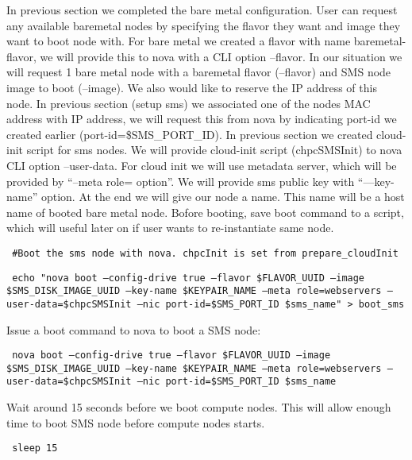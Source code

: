 \documentclass[12pt]{article}
\begin{document}
In previous section we completed the bare metal configuration. User can request any available baremetal nodes by specifying the flavor they want and image they want to boot node with. For bare metal we created a flavor with name baremetal-flavor, we will provide this to nova with a CLI option –flavor. In our situation we will request 1 bare metal node with a baremetal flavor (--flavor) and SMS node image to boot (--image).  We also would like to reserve the IP address of this node. In previous section (setup sms) we associated one of the nodes MAC address with IP address, we will request this from nova by indicating port-id we created earlier (port-id=\${SMS\_PORT\_ID}). In previous section we created cloud-init script for sms nodes. We will provide cloud-init script (chpcSMSInit) to nova CLI option –user-data. For cloud init we will use metadata server, which will be provided by “–meta role= option”. We will provide sms public key with “—key-name” option. At the end we will give our node a name. This name will be a host name of booted bare metal node.
Bofore booting, save boot command to a script, which will useful later on if user wants to re-instantiate same node.

\begin{bash}\texttt{\small{ \#Boot the sms node with nova. chpcInit is set from prepare\_cloudInit}}\end{bash}
\begin{bash}\texttt{\small{     echo "nova boot --config-drive true --flavor \${FLAVOR\_UUID} --image \${SMS\_DISK\_IMAGE\_UUID} --key-name \${KEYPAIR\_NAME} --meta role=webservers --user-data=\$chpcSMSInit --nic port-id=\${SMS\_PORT\_ID} \${sms\_name}" > boot\_sms}}\end{bash}

Issue a boot command to nova to boot a SMS node:

\begin{bash}\texttt{\small{ nova boot --config-drive true --flavor \${FLAVOR\_UUID} --image \${SMS\_DISK\_IMAGE\_UUID} --key-name \${KEYPAIR\_NAME} --meta role=webservers --user-data=\$chpcSMSInit --nic port-id=\${SMS\_PORT\_ID} \${sms\_name}}}\end{bash}

Wait around 15 seconds before we boot compute nodes. This will allow enough time to boot SMS node before compute nodes starts. 

\begin{bash}\texttt{\small{ sleep 15}}\end{bash}
\end{document}
